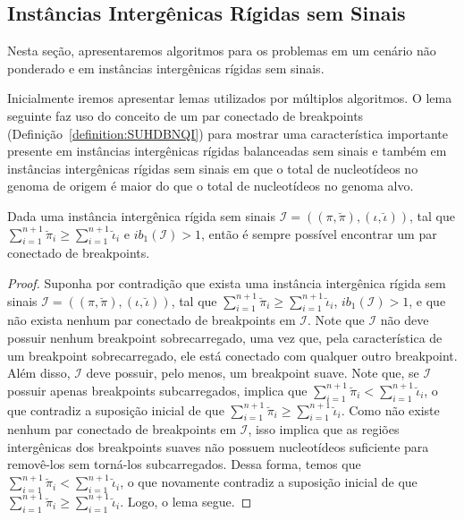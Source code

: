 \subsection{Instâncias Intergênicas Rígidas sem Sinais}

Nesta seção, apresentaremos algoritmos para os problemas em um cenário não ponderado e em instâncias intergênicas rígidas sem sinais.

Inicialmente iremos apresentar lemas utilizados por múltiplos algoritmos. O lema seguinte faz uso do conceito de um par conectado de breakpoints (Definição~\ref{definition:SUHDBNQI}) para mostrar uma característica importante presente em instâncias intergênicas rígidas balanceadas sem sinais e também em instâncias intergênicas rígidas sem sinais em que o total de nucleotídeos no genoma de origem é maior do que o total de nucleotídeos no genoma alvo.

\begin{lemma}\label{lemma:WYEZMYTM}
Dada uma instância intergênica rígida sem sinais $\mathcal{I}=((\pi,\breve\pi),(\iota,\breve\iota))$, tal que $\sum_{i=1}^{n+1}\breve\pi_i \ge \sum_{i=1}^{n+1}\breve\iota_i$ e $ib_1(\mathcal{I}) > 1$, então é sempre possível encontrar um par conectado de breakpoints.
\end{lemma}
\begin{proof}
Suponha por contradição que exista uma instância intergênica rígida sem sinais $\mathcal{I}=((\pi,\breve\pi),(\iota,\breve\iota))$, tal que $\sum_{i=1}^{n+1}\breve\pi_i \ge \sum_{i=1}^{n+1}\breve\iota_i$, $ib_1(\mathcal{I}) > 1$, e que não exista nenhum par conectado de breakpoints em $\mathcal{I}$. Note que $\mathcal{I}$ não deve possuir nenhum breakpoint sobrecarregado, uma vez que, pela característica de um breakpoint sobrecarregado, ele está conectado com qualquer outro breakpoint. Além disso, $\mathcal{I}$ deve possuir, pelo menos, um breakpoint suave. Note que, se $\mathcal{I}$ possuir apenas breakpoints subcarregados, implica que $\sum_{i=1}^{n+1}\breve\pi_i < \sum_{i=1}^{n+1}\breve\iota_i$, o que contradiz a suposição inicial de que $\sum_{i=1}^{n+1}\breve\pi_i \ge \sum_{i=1}^{n+1}\breve\iota_i$. Como não existe nenhum par conectado de breakpoints em $\mathcal{I}$, isso implica que as regiões intergênicas dos breakpoints suaves não possuem nucleotídeos suficiente para removê-los sem torná-los subcarregados. Dessa forma, temos que $\sum_{i=1}^{n+1}\breve\pi_i < \sum_{i=1}^{n+1}\breve\iota_i$, o que novamente contradiz a suposição inicial de que $\sum_{i=1}^{n+1}\breve\pi_i \ge \sum_{i=1}^{n+1}\breve\iota_i$. Logo, o lema segue.
\end{proof}

